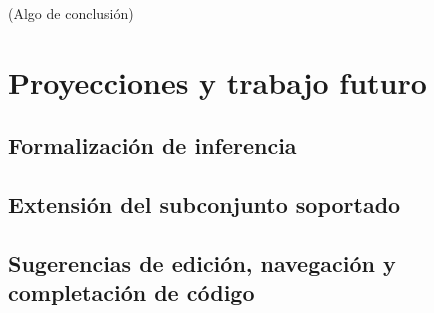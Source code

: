 \begin{conclusion}
	(Algo de conclusión)
	\section*{Proyecciones y trabajo futuro}
	\subsection*{Formalización de inferencia}
	\subsection*{Extensión del subconjunto soportado}
	\subsection*{Sugerencias de edición, navegación y completación de código}


\end{conclusion}
